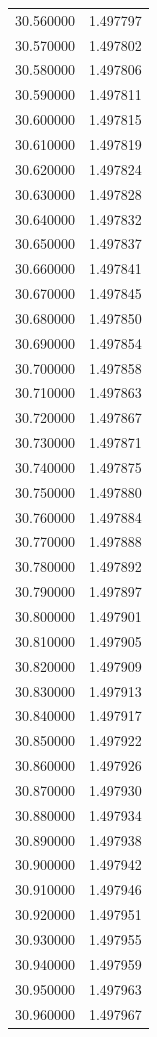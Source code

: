 \begin{tabular}{rr}
30.560000 & 1.497797 \\
30.570000 & 1.497802 \\
30.580000 & 1.497806 \\
30.590000 & 1.497811 \\
30.600000 & 1.497815 \\
30.610000 & 1.497819 \\
30.620000 & 1.497824 \\
30.630000 & 1.497828 \\
30.640000 & 1.497832 \\
30.650000 & 1.497837 \\
30.660000 & 1.497841 \\
30.670000 & 1.497845 \\
30.680000 & 1.497850 \\
30.690000 & 1.497854 \\
30.700000 & 1.497858 \\
30.710000 & 1.497863 \\
30.720000 & 1.497867 \\
30.730000 & 1.497871 \\
30.740000 & 1.497875 \\
30.750000 & 1.497880 \\
30.760000 & 1.497884 \\
30.770000 & 1.497888 \\
30.780000 & 1.497892 \\
30.790000 & 1.497897 \\
30.800000 & 1.497901 \\
30.810000 & 1.497905 \\
30.820000 & 1.497909 \\
30.830000 & 1.497913 \\
30.840000 & 1.497917 \\
30.850000 & 1.497922 \\
30.860000 & 1.497926 \\
30.870000 & 1.497930 \\
30.880000 & 1.497934 \\
30.890000 & 1.497938 \\
30.900000 & 1.497942 \\
30.910000 & 1.497946 \\
30.920000 & 1.497951 \\
30.930000 & 1.497955 \\
30.940000 & 1.497959 \\
30.950000 & 1.497963 \\
30.960000 & 1.497967 \\

\end{tabular}
